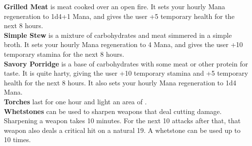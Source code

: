 \textbf{Grilled Meat} is meat cooked over an open fire. It sets your hourly Mana regeneration to 1d4+1 Mana, and gives the user +5 temporary health for the next 8 hours.\\


\textbf{Simple Stew} is a mixture of carbohydrates and meat simmered in a simple broth. It sets your hourly Mana regeneration to 4 Mana, and gives the user +10 temporary stamina for the next 8 hours.\\


\textbf{Savory Porridge} is a base of carbohydrates with some meat or other protein for taste. It is quite harty, giving the user +10 temporary stamina and +5 temporary health for the next 8 hours. It also sets your hourly Mana regeneration to 1d4 Mana.\\


\textbf{Torches} last for one hour and light an area of .\\


\textbf{Whetstones} can be used to sharpen weapons that deal cutting damage. Sharpening a weapon takes 10 minutes. For the next 10 attacks after that, that weapon also deals a critical hit on a natural 19. A whetstone can be used up to 10 times.\\